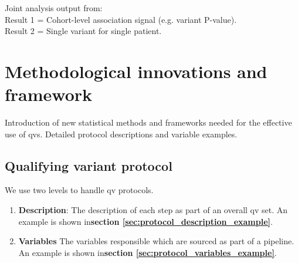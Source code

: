 \begin{tcolorbox}[
    colback=white!0,  %
    colframe=black,  %
    boxrule=1pt,  %
    arc=1mm,  %
    outer arc=1mm,
    title=\textbf{Example diagrammatic representation}
]


Joint analysis output from:\\
Result 1 = Cohort-level association signal (e.g. variant P-value). \\
Result 2 = Single variant for single patient.
\end{tcolorbox}



\section{Methodological innovations and framework}
Introduction of new statistical methods and frameworks needed for the effective use of \ac{qv}s. Detailed protocol descriptions and variable examples.

\subsection{Qualifying variant protocol}

We use two levels to handle \ac{qv} protocols. 

\begin{enumerate}
\item \textbf{Description}: The description of each step as part of an overall \ac{qv} set. An example is shown in\textbf{section \ref{sec:protocol_description_example}}.\\
\item \textbf{Variables} The variables responsible which are sourced as part of a pipeline. An example is shown in\textbf{section \ref{sec:protocol_variables_example}}.
\end{enumerate}


